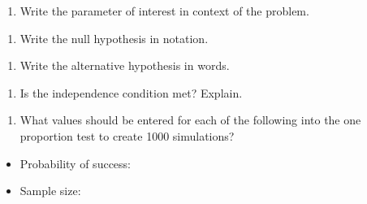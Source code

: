 \documentclass[
]{report}
\providecommand{\tightlist}{%
  \setlength{\itemsep}{0pt}\setlength{\parskip}{0pt}}
\begin{document}
\vspace{0.3in}

\begin{enumerate}
\def\labelenumi{\arabic{enumi}.}
\setcounter{enumi}{2}
\tightlist
\item
  Write the parameter of interest in context of the problem.
\end{enumerate}

\vspace{0.8in}

\begin{enumerate}
\def\labelenumi{\arabic{enumi}.}
\setcounter{enumi}{3}
\tightlist
\item
  Write the null hypothesis in notation.
\end{enumerate}

\vspace{0.3in}

\begin{enumerate}
\def\labelenumi{\arabic{enumi}.}
\setcounter{enumi}{4}
\tightlist
\item
  Write the alternative hypothesis in words.
\end{enumerate}

\vspace{0.8in}

\begin{enumerate}
\def\labelenumi{\arabic{enumi}.}
\setcounter{enumi}{5}
\tightlist
\item
  Is the independence condition met? Explain.
\end{enumerate}

\vspace{0.6in}

\begin{enumerate}
\def\labelenumi{\arabic{enumi}.}
\setcounter{enumi}{6}
\tightlist
\item
  What values should be entered for each of the following into the one proportion test to create 1000 simulations?
\end{enumerate}

\vspace{1mm}

\begin{itemize}
\tightlist
\item
  Probability of success:
\end{itemize}

\vspace{.2in}

\begin{itemize}
\tightlist
\item
  Sample size:
\end{itemize}
\end{document}
